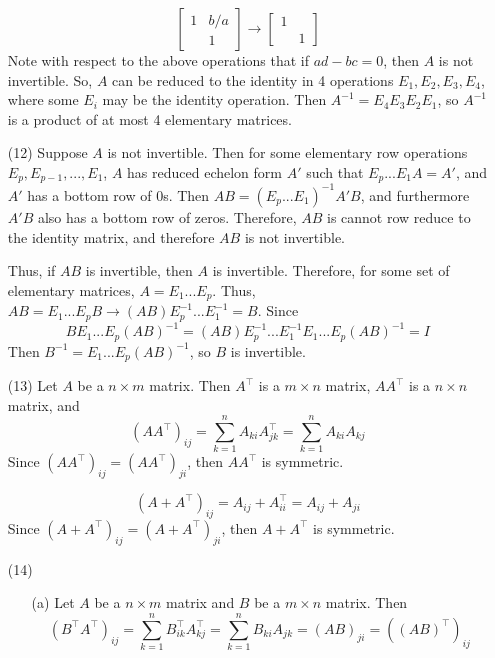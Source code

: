 \begin{itemize}
$$\begin{bmatrix}
1 & b/a \\
& 1
\end{bmatrix} \rightarrow \begin{bmatrix}
1 & \\
& 1
\end{bmatrix}$$
Note with respect to the above operations that if $ad - bc = 0$, then $A$ is not invertible. So, $A$ can be reduced to the identity in 4 operations $E_1, E_2, E_3, E_4$, where some $E_i$ may be the identity operation. Then $A^{-1} = E_4E_3E_2E_1$, so $A^{-1}$ is a product of at most 4 elementary matrices.
\item[(12)]
Suppose $A$ is not invertible. Then for some elementary row operations $E_p, E_{p-1}, ..., E_1$, $A$ has reduced echelon form $A'$ such that $E_p...E_1A = A'$, and $A'$ has a bottom row of 0s. Then $AB = (E_p...E_1)^{-1}A'B$, and furthermore $A'B$ also has a bottom row of zeros. Therefore, $AB$ is cannot row reduce to the identity matrix, and therefore $AB$ is not invertible.

Thus, if $AB$ is invertible, then $A$ is invertible. Therefore, for some set of elementary matrices, $A = E_1...E_p$. Thus, $AB = E_1...E_pB \rightarrow (AB)E_p^{-1}...E_1^{-1} = B$. Since 
$$BE_1...E_p(AB)^{-1} =(AB)E_p^{-1}...E_1^{-1}E_1...E_p(AB)^{-1} = I$$
Then $B^{-1} = E_1...E_p(AB)^{-1}$, so $B$ is invertible.
\item[(13)]
Let $A$ be a $n \times m$ matrix. Then $A^\top$ is a $m \times n$ matrix, $AA^\top$ is a $n \times n$ matrix, and
$$(AA^\top)_{ij} = \sum_{k=1}^n A_{ki}A^\top_{jk} = \sum_{k=1}^n A_{ki}A_{kj}$$
Since $(AA^\top)_{ij} = (AA^\top)_{ji}$, then $AA^\top$ is symmetric.

$$(A + A^\top)_{ij} = A_{ij} + A^\top_{ii} = A_{ij} + A_{ji}$$
Since $(A + A^\top)_{ij} = (A + A^\top)_{ji}$, then $A + A^\top$ is symmetric.
\item[(14)]
\begin{itemize}
\item[(a)] 
Let $A$ be a $n \times m$ matrix and $B$ be a $m \times n$ matrix. Then
$$(B^\top A^\top)_{ij} = \sum_{k=1}^n B^\top_{ik}A^\top_{kj} = \sum_{k=1}^n B_{ki}A_{jk} = (AB)_{ji} = ((AB)^\top)_{ij}$$


\end{itemize}
\end{itemize}
